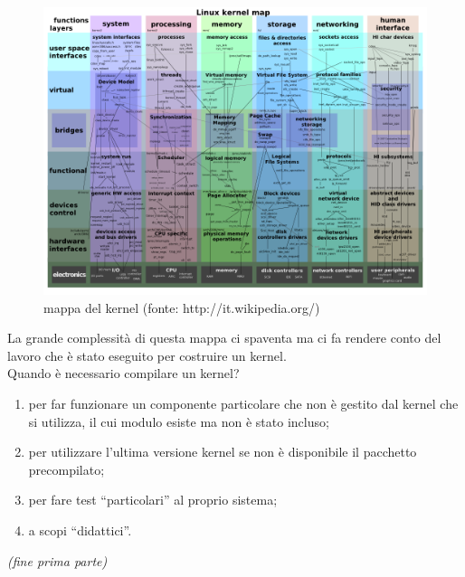 \begin{figure}[!t]
\centering
\includegraphics[scale=.40]{articoli/sistema_avanzato/immagini/kernel_map.png}
\caption{mappa del kernel ({\scriptsize fonte: http://it.wikipedia.org/})}
\end{figure}

La grande complessità di questa mappa ci spaventa ma ci fa rendere conto del lavoro che è stato eseguito per costruire un kernel.\\

Quando è necessario compilare un kernel?

\begin{enumerate}
\item  per far funzionare un componente particolare che non è gestito dal kernel che si utilizza, il cui modulo esiste ma non è stato incluso;
\item per utilizzare l'ultima versione kernel se non è disponibile il pacchetto precompilato;
\item per fare test “particolari” al proprio sistema;
\item a scopi “didattici''.
\end{enumerate}

\hfill {\itshape (fine prima parte)}
